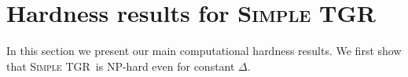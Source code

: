 \documentclass[a4paper,UKenglish,cleveref, autoref, thm-restate]{lipics-v2021}
\newcommand{\ie}{i.\,e.,\ }
\newcommand{\deltaExact}{\textsc{Simple TGR}}
\newcommand{\kDeltaExact}{\textsc{$(k,\Delta)$-TGR}}
\begin{document}

\section{Hardness results for \deltaExact}  
In this section we present our main computational hardness results.  
We first show that \deltaExact\ is NP-hard even for constant $\Delta$. 
\end{document}
